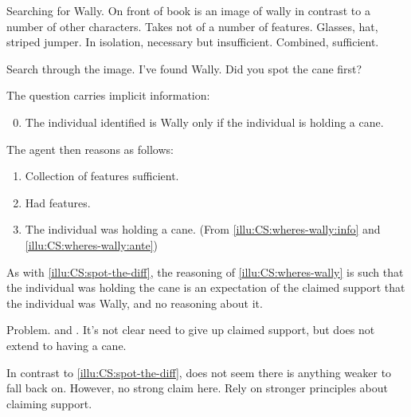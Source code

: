\begin{note}
  \begin{illustration}
    \label{illu:CS:wheres-wally}
    Searching for Wally.
    On front of book is an image of wally in contrast to a number of other characters.
    Takes not of a number of features.
    Glasses, hat, striped jumper.
    In isolation, necessary but insufficient.
    Combined, sufficient.

    Search through the image.
    I've found Wally.
    Did you spot the cane first?

    The question carries implicit information:
    \begin{enumerate}[label=\arabic*., ref=(I\ref{illu:CS:wheres-wally}.\arabic*)]
      \setcounter{enumi}{-1}
    \item\label{illu:CS:wheres-wally:info} The individual identified is Wally only if the individual is holding a cane.
    \end{enumerate}

    The agent then reasons as follows:

    \begin{enumerate}[label=\arabic*., ref=(I\ref{illu:CS:wheres-wally}.\arabic*), resume]
    \item Collection of features sufficient.
    \item\label{illu:CS:wheres-wally:ante} Had features.
    \item The individual was holding a cane. \hfill (From \ref{illu:CS:wheres-wally:info} and \ref{illu:CS:wheres-wally:ante})
    \end{enumerate}
  \end{illustration}

  As with \autoref{illu:CS:spot-the-diff}, the reasoning of \autoref{illu:CS:wheres-wally} is such that the individual was holding the cane is an expectation of the claimed support that the individual was Wally, and no reasoning about it.
\end{note}

\begin{note}
  Problem.
  \requ{} and \expec{}.
  It's not clear need to give up claimed support, but does not extend to having a cane.

  In contrast to \ref{illu:CS:spot-the-diff}, does not seem there is anything weaker to fall back on.
  However, no strong claim here.
  Rely on stronger principles about claiming support.
\end{note}

